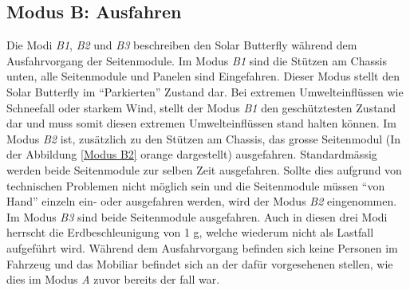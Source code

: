 \subsection{Modus B: Ausfahren}
Die Modi \emph{B1}, \emph{B2} und \emph{B3} beschreiben den Solar Butterfly während dem Ausfahrvorgang der Seitenmodule. Im Modus \emph{B1} sind die Stützen am Chassis unten, alle Seitenmodule und Panelen sind Eingefahren. Dieser Modus stellt den Solar Butterfly im ``Parkierten'' Zustand dar. Bei extremen Umwelteinflüssen wie Schneefall oder starkem Wind, stellt der Modus \emph{B1} den geschütztesten Zustand dar und muss somit diesen extremen Umwelteinflüssen stand halten können.
Im Modus \emph{B2} ist, zusätzlich zu den Stützen am Chassis, das grosse Seitenmodul (In der Abbildung \ref{Modus B2} orange dargestellt) ausgefahren. Standardmässig werden beide Seitenmodule zur selben Zeit ausgefahren. Sollte dies aufgrund von technischen Problemen nicht möglich sein und die Seitenmodule müssen ``von Hand'' einzeln ein- oder ausgefahren werden, wird der Modus \emph{B2} eingenommen. Im Modus \emph{B3} sind beide Seitenmodule ausgefahren.
Auch in diesen drei Modi herrscht die Erdbeschleunigung von 1 g, welche wiederum nicht als Lastfall aufgeführt wird. Während dem Ausfahrvorgang befinden sich keine Personen im Fahrzeug und das Mobiliar befindet sich an der dafür vorgesehenen stellen, wie dies im Modus \emph{A} zuvor bereits der fall war.


